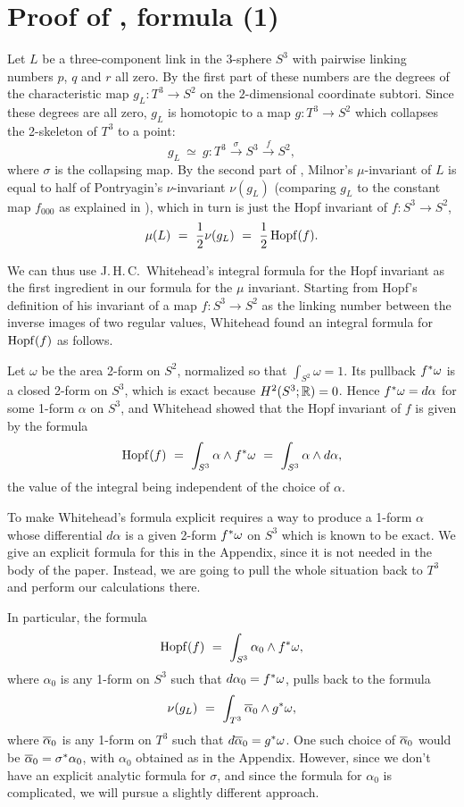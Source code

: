 \part{Proof of , formula (1)}

Let $L$ be a three-component link in the 3-sphere $S^3$ with pairwise
linking numbers $p$, $q$ and $r$ all zero.  By the first part of  these numbers are the degrees of the characteristic map $g_L\colon T^3\to S^2$ on the $2$-dimensional coordinate subtori. Since these degrees are all zero, $g_L$ is homotopic to a map $g\colon T^3\to S^2$ which collapses the 2-skeleton of $T^3$ to a point:
$$
g_L\ \simeq \ g\colon T^3 \stackrel{\sigma}{\longrightarrow}S^3 \stackrel{f}{\longrightarrow}S^2,
$$
where $\sigma$ is the collapsing map.  By the second part of , Milnor's $\mu$-invariant of $L$ is equal to half of Pontryagin's $\nu$-invariant $\nu(g_L)$ (comparing $g_L$ to the constant map $f_{000}$ as explained in ), which in turn is just the Hopf invariant of $f\colon S^3\to S^2$,
$$
\mu(L)\ = \ {1\over 2}\nu(g_L)\ = \ {1\over 2}\mathop{\rm Hopf}\nolimits(f).
$$

We can thus use J.\,H.\,C.~Whitehead's integral formula for the Hopf invariant as the first ingredient in our formula for the $\mu$ invariant.  Starting from 
Hopf's definition of his invariant of a map $f\colon S^3\to S^2$ as the linking number between the inverse images of two regular values, Whitehead \cite{Whitehead} found an integral formula for $\mathop{\rm Hopf}\nolimits(f)$ as follows.

Let $\omega$ be the area 2-form on $S^2$, normalized so that $\int_{S^2}
\omega=1$. Its pullback $f^*\omega$ is a closed 2-form on $S^3$,
which is exact because $H^2(S^3;\mathbb R)=0$. Hence $f^*\omega=d\alpha$ for some 1-form $\alpha$ on $S^3$, and Whitehead showed that the Hopf invariant of $f$ is given by the formula
$$
\Hopf(f) \ = \ \int_{S^3}\alpha\wedge f^\dast\omega \ 
= \ \int_{S^3}\alpha\wedge d\alpha,
$$
the value of the integral being independent of the choice of $\alpha$. 

To make Whitehead's formula explicit requires a way to produce a 1-form
$\alpha$ whose differential $d\alpha$ is a given 2-form $f^*\omega$ on $S^3$ which is known to be exact. We give an explicit formula for this in the 
Appendix, since it is not needed in the body of the paper. Instead, we are
going to pull the whole situation back to $T^3$ and perform our calculations
there.

In particular, the formula
$$
\mathop{\rm Hopf}\nolimits(f) \ = \  \int_{S^3}\alpha_0\wedge f^*\omega,
$$
where $\alpha_0$ is any 1-form on $S^3$ such that $d\alpha_0=f^*\omega$, pulls back to the formula
$$
\nu(g_L)\ = \ \int_{T^3}\bah{\alpha_0}\wedge g^\dast\omega,
$$
where $\overline\alpha_0$ is any 1-form on $T^3$ such that $d\overline\alpha_0 = g^*\omega$.  One such choice of $\overline\alpha_0$ would be $\overline\alpha_0 = \sigma^*\alpha_0$, with $\alpha_0$
obtained as in the Appendix.   However, since we don't have an explicit analytic formula
for $\sigma$, and since the formula for $\alpha_0$ is complicated, we will pursue 
a slightly different approach.


